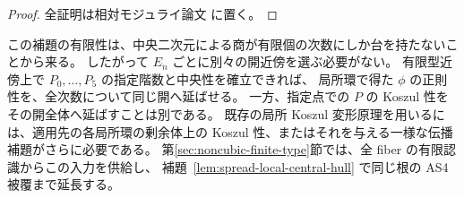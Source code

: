 \begin{proof}
全証明は相対モジュライ論文 \cite[\texttt{noncubic_local_tails}]{QuadricModuli2026} に置く。
\end{proof}

\begin{remark}
この補題の有限性は、中央二次元による商が有限個の次数にしか台を持たないことから来る。
したがって $E_n$ ごとに別々の開近傍を選ぶ必要がない。
有限型近傍上で $P_0,\ldots,P_5$ の指定階数と中央性を確立できれば、
局所環で得た $\phi$ の正則性を、全次数について同じ開へ延ばせる。
一方、指定点での $P$ の Koszul 性をその開全体へ延ばすことは別である。
既存の局所 Koszul 変形原理を用いるには、適用先の各局所環の剰余体上の
Koszul 性、またはそれを与える一様な伝播補題がさらに必要である。
第\ref{sec:noncubic-finite-type}節では、全 fiber の有限認識からこの入力を供給し、
補題~\ref{lem:spread-local-central-hull} で同じ根の AS4 被覆まで延長する。
\end{remark}
